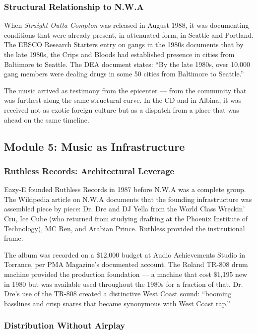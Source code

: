 \documentclass[11pt,letterpaper]{article}
\begin{document}
\subsubsection{Structural Relationship to N.W.A}

When \textit{Straight Outta Compton} was released in August 1988, it was documenting conditions that were already present, in attenuated form, in Seattle and Portland. The EBSCO Research Starters entry on gangs in the 1980s documents that by the late 1980s, the Crips and Bloods had established presence in cities from Baltimore to Seattle. The DEA document states: ``By the late 1980s, over 10,000 gang members were dealing drugs in some 50 cities from Baltimore to Seattle.''

The music arrived as testimony from the epicenter --- from the community that was furthest along the same structural curve. In the CD and in Albina, it was received not as exotic foreign culture but as a dispatch from a place that was ahead on the same timeline.

\subsection{Module 5: Music as Infrastructure}

\subsubsection{Ruthless Records: Architectural Leverage}

Eazy-E founded Ruthless Records in 1987 before N.W.A was a complete group. The Wikipedia article on N.W.A documents that the founding infrastructure was assembled piece by piece: Dr. Dre and DJ Yella from the World Class Wreckin' Cru, Ice Cube (who returned from studying drafting at the Phoenix Institute of Technology), MC Ren, and Arabian Prince. Ruthless provided the institutional frame.

The album was recorded on a \$12,000 budget at Audio Achievements Studio in Torrance, per PMA Magazine's documented account. The Roland TR-808 drum machine provided the production foundation --- a machine that cost \$1,195 new in 1980 but was available used throughout the 1980s for a fraction of that. Dr. Dre's use of the TR-808 created a distinctive West Coast sound: ``booming basslines and crisp snares that became synonymous with West Coast rap.''

\subsubsection{Distribution Without Airplay}
\end{document}
